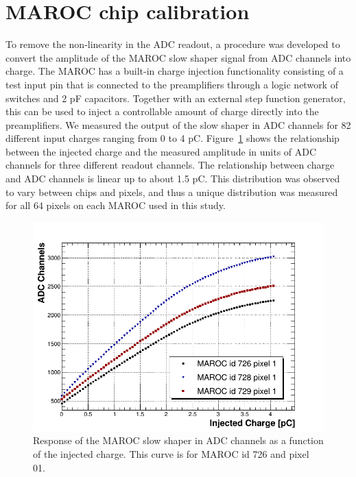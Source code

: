 \section{MAROC chip calibration}

To remove the non-linearity in the ADC readout, a procedure was developed to convert the amplitude of the MAROC slow shaper signal from ADC channels into charge. The MAROC has a built-in charge injection functionality consisting of a test input pin that is connected to the preamplifiers through a logic network of switches and 2 pF capacitors. Together with an external step function generator, this can be used to inject a controllable amount of charge directly into the preamplifiers. We measured the output of the slow shaper in ADC channels for 82 different input charges ranging from 0 to 4 pC. Figure~\ref{fig:MAROCcalib} shows the relationship between the injected charge and the measured amplitude in units of ADC channels for three different readout channels. The relationship between charge and ADC channels is linear up to about 1.5 pC. This distribution was observed to vary between chips and pixels, and thus a unique distribution was measured for all 64 pixels on each MAROC used in this study. 

\begin{figure}[hbt]
	\centering
	\includegraphics[width=\linewidth]{figures/adc_v_charge.png}
	\caption{Response of the MAROC slow shaper in ADC channels as a function of the injected charge. This curve is for MAROC id 726 and pixel 01.}
	\label{fig:MAROCcalib}
\end{figure}

